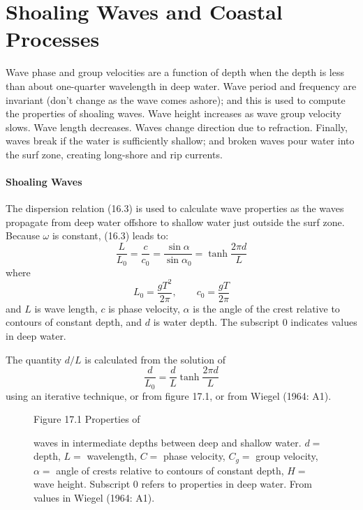 \section{Shoaling Waves and Coastal Processes}
Wave phase and group velocities are a function
of depth when the depth is less than about one-quarter wavelength in
deep water. Wave period and frequency are invariant (don't change as
the wave comes ashore); and this is used to compute the properties of
shoaling waves. Wave height increases as wave group velocity
slows. Wave length decreases. Waves change direction due to
refraction. Finally, waves break if the water is sufficiently shallow;
and broken waves pour water into the surf zone, creating long-shore
and rip currents.

\paragraph{Shoaling Waves}
The dispersion relation (16.3) is used to calculate wave properties as
the waves propagate from deep water offshore to shallow water just
outside the surf zone. Because $\omega$ is constant, (16.3) leads to:
\begin{equation}
\frac{L}{L_{0}} = \frac{c}{c_{0}}=\frac{\sin \alpha }{\sin \alpha _{0}} = \tanh
\frac{2 \pi d}{L} \label{eq:intermed}
\end{equation}
where
\begin{equation}
L_{0} = \frac{g T^{2}}{2 \pi }, \qquad c_{0} = \frac{g T}{2 \pi } \label{eq:Lzero}
\end{equation}
and $L$ is wave length, $c$ is phase velocity, $\alpha $ is the angle
of the crest relative to contours of constant depth, and $d$ is water
depth. The subscript $0$ indicates values in deep water.

The quantity $d/L$ is calculated from the solution of
\begin{equation}
\frac{d}{L_{0}} = \frac{d}{L} \tanh \frac{2 \pi d}{L} \label{eq:intermediate}
\end{equation}
using an iterative technique, or from figure 17.1, or from Wiegel (1964: A1).

\begin{figure}[t!]
{}
\footnotesize
Figure 17.1 Properties of \rule{0mm}{3ex}waves in intermediate depths
between deep and shallow water. $d=$ depth, $L=$ wavelength, $C=$
phase velocity, $C_g=$ group velocity, $\alpha = $ angle of crests
relative to contours of constant depth, $H = $ wave height. Subscript
$0$ refers to properties in deep water. From values in Wiegel (1964:
A1).

\label{wiegelgraph}
\vspace{-4ex}
\end{figure}

